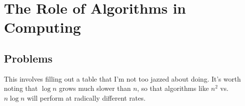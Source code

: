 \section{The Role of Algorithms in Computing}





\subsection{Problems}
    This involves filling out a table that I'm not too jazzed about doing.  It's worth noting that $\log n$ grows much slower than $n$, so that algorithms like $n^2$ vs. $n\log n$ will perform at radically different rates.